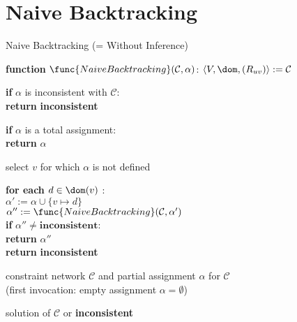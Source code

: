 \section{Naive Backtracking}

\begin{frame}{Naive Backtracking (= Without Inference)}
  \small
  \begin{block}{\textbf{function} $\func{NaiveBacktracking}(\mathcal{C},
      \alpha)$:}
    $\langle V, \dom, (R_{uv})\rangle := \mathcal{C}$

    \smallskip

    \textbf{if} $\alpha$ is inconsistent with $\mathcal{C}$:\\
    \ind\textbf{return} \textbf{inconsistent}

    \smallskip

    \textbf{if} $\alpha$ is a total assignment:\\
    \ind\textbf{return} $\alpha$

    \smallskip

    select  $v$ for which $\alpha$ is not
    defined

    \smallskip

    \textbf{for each} $d \in \dom(v)$ :\\
    \ind$\alpha' := \alpha \cup \{v \mapsto d\}$\\
    \ind$\alpha'' := \func{NaiveBacktracking}(\mathcal{C},\alpha')$\\
    \ind\textbf{if} $\alpha'' \neq \textbf{inconsistent}$:\\
    \indtwo\textbf{return} $\alpha''$\\
    \textbf{return} \textbf{inconsistent}
  \end{block}
   constraint network $\mathcal{C}$
  and partial assignment $\alpha$ for $\mathcal{C}$ \\
  (first invocation: empty assignment $\alpha = \emptyset$)

   solution of $\mathcal{C}$ or \textbf{inconsistent}
\end{frame}

